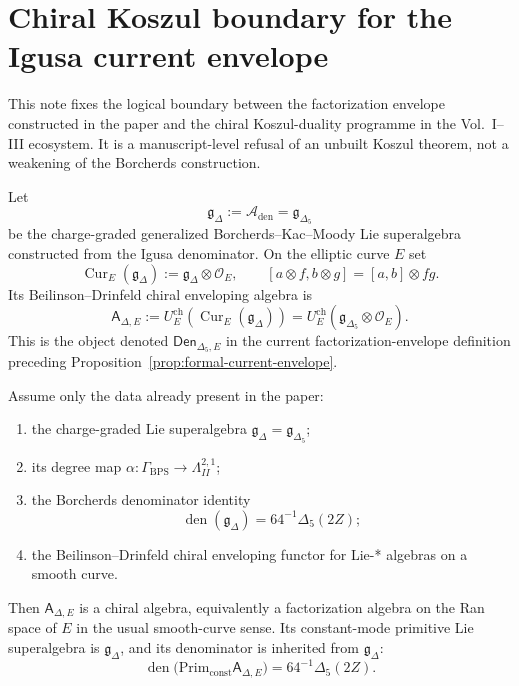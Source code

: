 \section{Chiral Koszul boundary for the Igusa current envelope}
\label{sec:chiral-koszul-boundary}

\providecommand{\Z}{\mathbb Z}
\providecommand{\C}{\mathbb C}
\providecommand{\autcor}{\mathfrak g_{\Delta_5}}
\providecommand{\Poly}{\mathcal P}
\providecommand{\smult}{\operatorname{smult}}

This note fixes the logical boundary between the factorization envelope
constructed in the paper and the chiral Koszul-duality programme in the
Vol.~I--III ecosystem.  It is a manuscript-level refusal of an unbuilt
Koszul theorem, not a weakening of the Borcherds construction.

\begin{definition}
\label{def:current-envelope-boundary}
Let
$$
\mathfrak g_\Delta:=\mathcal A_{\mathrm{den}}
=\mathfrak g_{\Delta_5}
$$
be the charge-graded generalized Borcherds--Kac--Moody Lie superalgebra
constructed from the Igusa denominator.  On the elliptic curve \(E\) set
$$
\operatorname{Cur}_E(\mathfrak g_\Delta)
:=\mathfrak g_\Delta\otimes\mathcal O_E,\qquad
[a\otimes f,b\otimes g]=[a,b]\otimes fg.
$$
Its Beilinson--Drinfeld chiral enveloping algebra is
$$
\mathsf A_{\Delta,E}
:=
U_E^{\mathrm{ch}}\!\left(\operatorname{Cur}_E(\mathfrak g_\Delta)\right)
=
U_E^{\mathrm{ch}}\!\left(\mathfrak g_{\Delta_5}\otimes\mathcal O_E\right).
$$
This is the object denoted \(\mathsf{Den}_{\Delta_5,E}\) in
the current factorization-envelope definition preceding
Proposition~\ref{prop:formal-current-envelope}.
\end{definition}

\begin{theorem}
\label{thm:bd-current-envelope-only}
Assume only the data already present in the paper:
\begin{enumerate}
\item the charge-graded Lie superalgebra
\(\mathfrak g_\Delta=\mathfrak g_{\Delta_5}\);
\item its degree map
\(\alpha:\Gamma_{\mathrm{BPS}}\to\Lambda^{2,1}_{II}\);
\item the Borcherds denominator identity
\[
\operatorname{den}(\mathfrak g_\Delta)=64^{-1}\Delta_5(2Z);
\]
\item the Beilinson--Drinfeld chiral enveloping functor for Lie-* algebras
on a smooth curve.
\end{enumerate}
Then \(\mathsf A_{\Delta,E}\) is a chiral algebra, equivalently a
factorization algebra on the Ran space of \(E\) in the usual smooth-curve
sense.  Its constant-mode primitive Lie superalgebra is
\(\mathfrak g_\Delta\), and its denominator is inherited from
\(\mathfrak g_\Delta\):
$$
\operatorname{den}\bigl(\mathrm{Prim}_{\mathrm{const}}\mathsf A_{\Delta,E}\bigr)
=64^{-1}\Delta_5(2Z).
$$
\end{theorem}

